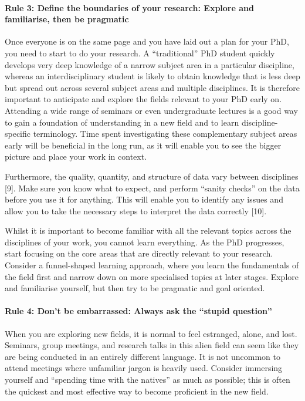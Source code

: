 \documentclass[12pt]{report}
\begin{document}
\paragraph{Rule 3: Define the boundaries of your research: Explore and familiarise, then be pragmatic}

Once everyone is on the same page and you have laid out a plan for your PhD, you need to start to do your research. A “traditional” PhD student quickly develops very deep knowledge of a narrow subject area in a particular discipline, whereas an interdisciplinary student is likely to obtain knowledge that is less deep but spread out across several subject areas and multiple disciplines. It is therefore important to anticipate and explore the fields relevant to your PhD early on. Attending a wide range of seminars or even undergraduate lectures is a good way to gain a foundation of understanding in a new field and to learn discipline-specific terminology. Time spent investigating these complementary subject areas early will be beneficial in the long run, as it will enable you to see the bigger picture and place your work in context.

Furthermore, the quality, quantity, and structure of data vary between disciplines [9]. Make sure you know what to expect, and perform “sanity checks” on the data before you use it for anything. This will enable you to identify any issues and allow you to take the necessary steps to interpret the data correctly [10].

Whilst it is important to become familiar with all the relevant topics across the disciplines of your work, you cannot learn everything. As the PhD progresses, start focusing on the core areas that are directly relevant to your research. Consider a funnel-shaped learning approach, where you learn the fundamentals of the field first and narrow down on more specialised topics at later stages. Explore and familiarise yourself, but then try to be pragmatic and goal oriented.

\paragraph{Rule 4: Don’t be embarrassed: Always ask the “stupid question”}

When you are exploring new fields, it is normal to feel estranged, alone, and lost. Seminars, group meetings, and research talks in this alien field can seem like they are being conducted in an entirely different language. It is not uncommon to attend meetings where unfamiliar jargon is heavily used. Consider immersing yourself and “spending time with the natives” as much as possible; this is often the quickest and most effective way to become proficient in the new field.
\end{document}
